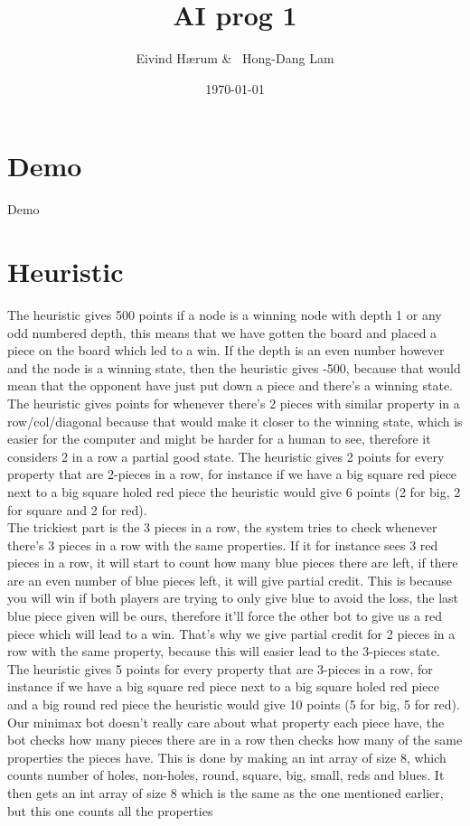 \documentclass[12pt, a4paper]{article}
\title{AI prog 1}
\author{Eivind Hærum \& \ Hong-Dang Lam}
\date{\today} %
\begin{document}
\maketitle
% 
% 
 
\newpage
\tableofcontents
\newpage
 
\section{Demo}
Demo

\section{Heuristic}
The heuristic gives 500 points if a node is a winning node with depth 1 or any odd numbered depth, this means that we have gotten the board and placed a piece on the board which led to a win. If the depth is an even number however and the node is a winning state, then the heuristic gives -500, because that would mean that the opponent have just put down a piece and there's a winning state. \\
The heuristic gives points for whenever there's 2 pieces with similar property in a row/col/diagonal because that would make it closer to the winning state, which is easier for the computer and might be harder for a human to see, therefore it considers 2 in a row a partial good state. The heuristic gives 2 points for every property that are 2-pieces in a row, for instance if we have a big square red piece next to a big square holed red piece the heuristic would give 6 points (2 for big, 2 for square and 2 for red).\\
The trickiest part is the 3 pieces in a row, the system tries to check whenever there's 3 pieces in a row with the same properties. If it for instance sees 3 red pieces in a row, it will start to count how many blue pieces there are left, if there are an even number of blue pieces left, it will give partial credit. This is because you will win if both players are trying to only give blue to avoid the loss, the last blue piece given will be ours, therefore it'll force the other bot to give us a red piece which will lead to a win. That's why we give partial credit for 2 pieces in a row with the same property, because this will easier lead to the 3-pieces state. The heuristic gives 5 points for every property that are 3-pieces in a row, for instance if we have a big square red piece next to a big square holed red piece and a big round red piece the heuristic would give 10 points (5 for big, 5 for red).\\
Our minimax bot doesn't really care about what property each piece have, the bot checks how many pieces there are in a row then checks how many of the same properties the pieces have. This is done by making an int array of size 8, which counts number of holes, non-holes, round, square, big, small, reds and blues. It then gets an int array of size 8 which is the same as the one mentioned earlier, but this one counts all the properties 
\end{document}
